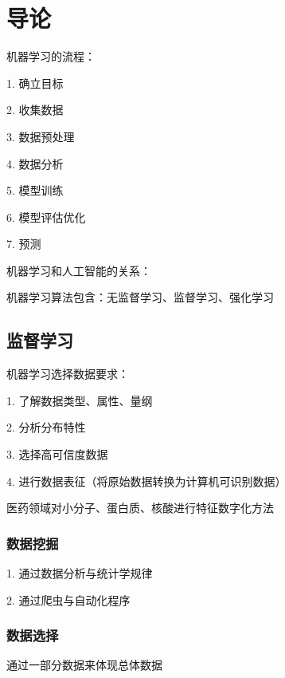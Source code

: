 \section{导论}%
\label{sec:导论}
\begin{notation}
    机器学习的流程：

    1. 确立目标

    2. 收集数据

    3. 数据预处理
    
    4. 数据分析

    5. 模型训练

    6. 模型评估优化

    7. 预测
\end{notation}
机器学习和人工智能的关系：
\begin{center}
\end{center}
机器学习算法包含：无监督学习、监督学习、强化学习
\subsection{监督学习}%
\label{sub:监督学习}
\begin{notation}
    机器学习选择数据要求：

    1. 了解数据类型、属性、量纲

    2. 分析分布特性

    3. 选择高可信度数据

    4. 进行数据表征（将原始数据转换为计算机可识别数据）
\end{notation}
\begin{eg}
    医药领域对小分子、蛋白质、核酸进行特征数字化方法
\end{eg}
\subsubsection{数据挖掘}%
\label{subsub:数据挖掘}
1. 通过数据分析与统计学规律

2. 通过爬虫与自动化程序
\subsubsection{数据选择}%
\label{subsub:数据选择}
通过一部分数据来体现总体数据

